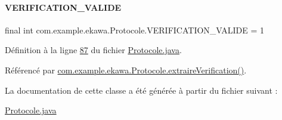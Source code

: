 \paragraph{\texorpdfstring{V\+E\+R\+I\+F\+I\+C\+A\+T\+I\+O\+N\+\_\+\+V\+A\+L\+I\+DE}{VERIFICATION\_VALIDE}}
{\footnotesize\ttfamily final int com.\+example.\+ekawa.\+Protocole.\+V\+E\+R\+I\+F\+I\+C\+A\+T\+I\+O\+N\+\_\+\+V\+A\+L\+I\+DE = 1\hspace{0.3cm}{\ttfamily [static]}}



Définition à la ligne \hyperlink{_protocole_8java_source_l00087}{87} du fichier \hyperlink{_protocole_8java_source}{Protocole.\+java}.



Référencé par \hyperlink{_protocole_8java_source_l00440}{com.\+example.\+ekawa.\+Protocole.\+extraire\+Verification()}.



La documentation de cette classe a été générée à partir du fichier suivant \+:\begin{DoxyCompactItemize}
\item 
\hyperlink{_protocole_8java}{Protocole.\+java}\end{DoxyCompactItemize}
